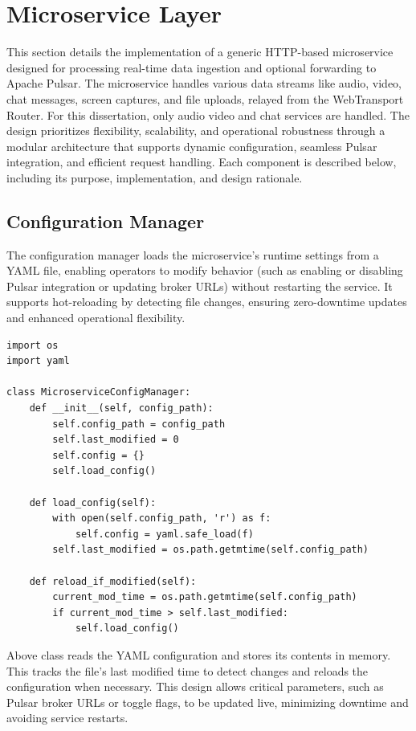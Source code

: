 \section{Microservice Layer}
This section details the implementation of a generic HTTP-based microservice designed for processing real-time data ingestion and optional forwarding to Apache Pulsar. The microservice handles various data streams like audio, video, chat messages, screen captures, and file uploads, relayed from the WebTransport Router. For this dissertation, only audio video and chat services are handled. The design prioritizes flexibility, scalability, and operational robustness through a modular architecture that supports dynamic configuration, seamless Pulsar integration, and efficient request handling. Each component is described below, including its purpose, implementation, and design rationale.

\subsection{Configuration Manager}
The configuration manager loads the microservice’s runtime settings from a YAML file, enabling operators to modify behavior (such as enabling or disabling Pulsar integration or updating broker URLs) without restarting the service. It supports hot-reloading by detecting file changes, ensuring zero-downtime updates and enhanced operational flexibility.

\begin{lstlisting}[breaklines=true,basicstyle=\small\ttfamily,frame=single]
import os
import yaml

class MicroserviceConfigManager:
    def __init__(self, config_path):
        self.config_path = config_path
        self.last_modified = 0
        self.config = {}
        self.load_config()

    def load_config(self):
        with open(self.config_path, 'r') as f:
            self.config = yaml.safe_load(f)
        self.last_modified = os.path.getmtime(self.config_path)

    def reload_if_modified(self):
        current_mod_time = os.path.getmtime(self.config_path)
        if current_mod_time > self.last_modified:
            self.load_config()
\end{lstlisting}

Above class reads the YAML configuration and stores its contents in memory. This tracks the file’s last modified time to detect changes and reloads the configuration when necessary. This design allows critical parameters, such as Pulsar broker URLs or toggle flags, to be updated live, minimizing downtime and avoiding service restarts.


